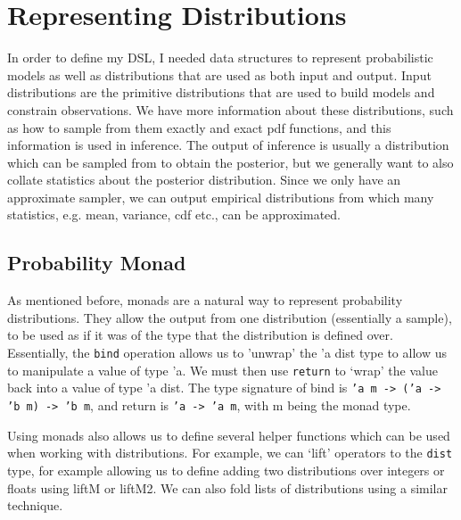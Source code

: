\section{Representing Distributions}
In order to define my DSL, I needed data structures to represent probabilistic models as well as distributions that are used as both input and output. Input distributions are the primitive distributions that are used to build models and constrain observations. We have more information about these distributions, such as how to sample from them exactly and exact pdf functions, and this information is used in inference. The output of inference is usually a distribution which can be sampled from to obtain the posterior, but we generally want to also collate statistics about the posterior distribution. Since we only have an approximate sampler, we can output empirical distributions from which many statistics, e.g. mean, variance, cdf etc., can be approximated.
	
\subsection{Probability Monad}
	
As mentioned before, monads are a natural way to represent probability distributions. They allow the output from one distribution (essentially a sample), to be used as if it was of the type that the distribution is defined over. Essentially, the \texttt{bind} operation allows us to 'unwrap' the 'a dist type to allow us to manipulate a value of type 'a. We must then use \texttt{return} to `wrap' the value back into a value of type 'a dist. The type signature of bind is \texttt{'a m -> ('a -> 'b m) -> 'b m}, and return is \texttt{'a -> 'a m}, with m being the monad type.
	
Using monads also allows us to define several helper functions which can be used when working with distributions. For example, we can `lift' operators to the \texttt{dist} type, for example allowing us to define adding two distributions over integers or floats using liftM or liftM2. We can also fold lists of distributions using a similar technique.
	
